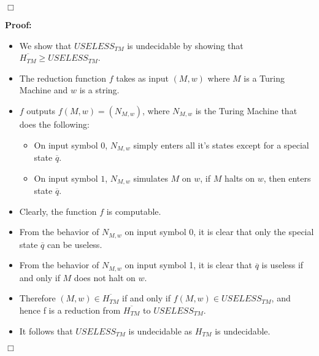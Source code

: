 \documentclass[11pt]{article}
\newcommand{\question}[2] {\vspace{.25in} \fbox{#1} #2 \vspace{.10in}}
\begin{document}
\indent $\Box$

\question{7}{\textbf{Proof:}}

\begin{itemize}
\item We show that $USELESS_{TM}$ is undecidable by showing that $\overline{H_{TM}} \geq USELESS_{TM}$.
\item The reduction function $f$ takes as input $(M,w)$ where $M$ is a Turing Machine and $w$ is a string. 
\item $f$ outputs $f(M,w) = (N_{M,w})$, where $N_{M,w}$ is the Turing Machine that does the following:
 \begin{center}
  \begin{itemize}
    \item On input symbol $0$, $N_{M,w}$ simply enters all it's states except for a special state $\overline{q}$.
    \item On input symbol $1$, $N_{M,w}$ simulates $M$ on $w$, if $M$ halts on $w$, then enters state $\overline{q}$.
  \end{itemize}
 \end{center}

\item Clearly, the function $f$ is computable. 
\item From the behavior of  $N_{M,w}$ on input symbol $0$, it is clear that only the special state $\overline{q}$ can be useless. 
\item From the behavior of $N_{M,w}$  on input symbol 1, it is clear that $\overline{q}$ is useless if and only if $M$ does not halt on $w$.
\item Therefore $(M,w) \in \overline{H_{TM}}$ if and only if $f(M,w) \in USELESS_{TM}$, and hence f is a reduction from $\overline{H_{TM}}$ to $USELESS_{TM}$. 
\item It follows that $USELESS_{TM}$ is undecidable as $H_{TM}$ is undecidable.
\end{itemize}

\indent $\Box$
\end{document}
